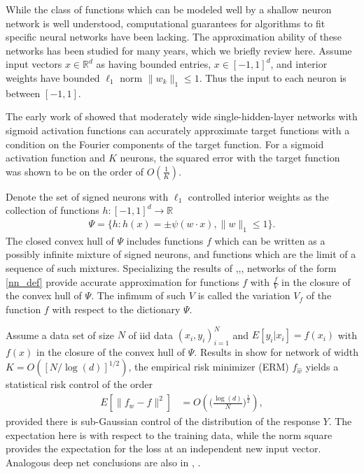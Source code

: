 \documentclass{article}
\numberwithin{equation}{section}
\theoremstyle{Lemma}
\theoremstyle{Corollary}
\theoremstyle{Theorem}
\theoremstyle{Remark}
\begin{document}
 While the class of functions which can be modeled well by a shallow neuron network is well understood, computational guarantees for algorithms to fit specific neural networks have been lacking. The approximation ability of these networks has been studied for many years, which we briefly review here. Assume input vectors $x \in \mathbb{R}^{d}$ as having bounded entries, $x \in [-1,1]^{d}$, and interior weights have bounded $\ell_{1}$ norm $\|w_{k}\|_{1} \leq 1$. Thus the input to each neuron is between $[-1,1]$. 

 The early work of \cite{barron1993universal} showed that moderately wide single-hidden-layer networks with sigmoid activation functions can accurately approximate target functions with a condition on the Fourier components of the target function. For a sigmoid activation function and $K$ neurons, the squared error with the target function was shown to be on the order of $O(\frac{1}{K})$.
 
Denote the set of signed neurons with $\ell_{1}$ controlled interior weights as the collection of functions $h:[-1,1]^{d} \to \mathbb{R}$
\begin{align}
\Psi = \{h:h(x)=\pm \psi(w \cdot x), \|w\|_{1}\leq 1\}.
\end{align}
The closed convex hull of $\Psi$ includes functions $f$ which can be written as a possibly infinite mixture of signed neurons, and functions which are the limit of a sequence of such mixtures. Specializing the results of \cite{barron1992neural},\cite{barron1993universal},\cite{klusowski2018approximation}, networks of the form \eqref{nn_def} provide accurate approximation for functions $f$ with $\frac{f}{V}$ in the closure of the convex hull of $\Psi$. The infimum of such $V$ is called the variation $V_{f}$ of the function $f$ with respect to the dictionary $\Psi$.

Assume a data set of size $N$ of iid data $(x_{i}, y_{i})_{i=1}^{N}$ and $E[y_{i}|x_{i}] =f(x_i)$ with $f(x)$ in the closure of the convex hull of $\Psi$. Results in \cite{barron2019complexity} show for network of width $K = O([N/\log(d)]^{1/2})$, the empirical risk minimizer (ERM) $f_{\hat{w}}$ yields a statistical risk control of the order
\begin{align}
    E[\|f_{\hat{w}}-f\|^{2}]&=O(\Big(\frac{\log(d)}{N}\Big)^{\frac{1}{2}}),
\end{align}
provided there is sub-Gaussian control of the distribution of the response $Y$. The expectation here is with respect to the training data, while the norm square provides the expectation for the loss at an independent new input vector. Analogous deep net conclusions are also in \cite{barron2018approximation}, \cite{barron2019complexity}.
\end{document}
